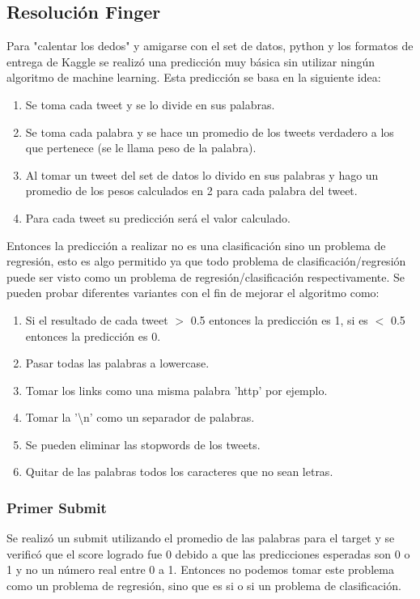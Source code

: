 \documentclass[12pt]{article}
\begin{document}
\newpage
\subsection{Resolución Finger}
Para "calentar los dedos" y amigarse con el set de datos, python y los formatos de entrega de Kaggle se realizó una predicción muy básica sin utilizar ningún algoritmo de machine learning.
Esta predicción se basa en la siguiente idea: 

\begin{enumerate}
  \item Se toma cada tweet y se lo divide en sus palabras.
  \item Se toma cada palabra y se hace un promedio de los tweets verdadero a los que pertenece (se le llama peso de la palabra).
  \item Al tomar un tweet del set de datos lo divido en sus palabras y hago un promedio de los pesos calculados en 2 para cada palabra del tweet.
  \item Para cada tweet su predicción será el valor calculado.
\end{enumerate}

Entonces la predicción a realizar no es una clasificación sino un problema de regresión, esto es algo permitido ya que todo problema de clasificación/regresión puede ser visto como un problema de regresión/clasificación respectivamente.
Se pueden probar diferentes variantes  con el fin de mejorar el algoritmo como:

\begin{enumerate}
  \item Si el resultado de cada tweet $>$ 0.5 entonces la predicción es 1, si es $<$ 0.5 entonces la predicción es 0.
  \item Pasar todas las palabras a lowercase.
  \item Tomar los links como una misma palabra 'http' por ejemplo.
  \item Tomar la '\textbackslash n' como un separador de palabras.
  \item Se pueden eliminar las stopwords de los tweets.
  \item Quitar de las palabras todos los caracteres que no sean letras.
\end{enumerate}

\subsubsection{Primer Submit}
Se realizó un submit utilizando el promedio de las palabras para el target y se verificó que el score logrado fue 0 debido a que las predicciones esperadas son 0 o 1 y no un número real entre 0 a 1.
Entonces no podemos tomar este problema como un problema de regresión, sino que es si o si un problema de clasificación.
\end{document}
